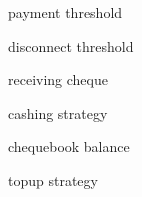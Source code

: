 
payment threshold

disconnect threshold

receiving cheque

cashing strategy

chequebook balance 

topup strategy

